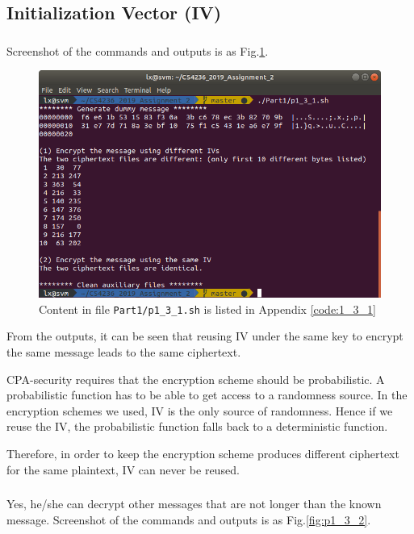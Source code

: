 \subsection{Initialization Vector (IV)}

\subsubsection{}

Screenshot of the commands and outputs is as Fig.\ref{fig:p1_3_1}.

\begin{figure}[tb!]
\centering
\includegraphics[width=\columnwidth]{pictures/p1_3_1.png}
\caption{
    Content in file \texttt{Part1/p1\_3\_1.sh} is listed in Appendix \ref{code:1_3_1}
}
\label{fig:p1_3_1}
\end{figure}

From the outputs, it can be seen that reusing IV under the same key to encrypt the same message leads to the same ciphertext.

CPA-security requires that the encryption scheme should be probabilistic. 
A probabilistic function has to be able to get access to a randomness source.
In the encryption schemes we used, IV is the only source of randomness.
Hence if we reuse the IV, the probabilistic function falls back to a deterministic function.

Therefore, in order to keep the encryption scheme produces different ciphertext for the same plaintext, IV can never be reused.

\subsubsection{}
Yes, he/she can decrypt other messages that are not longer than the known message. Screenshot of the commands and outputs is as Fig.\ref{fig:p1_3_2}.

